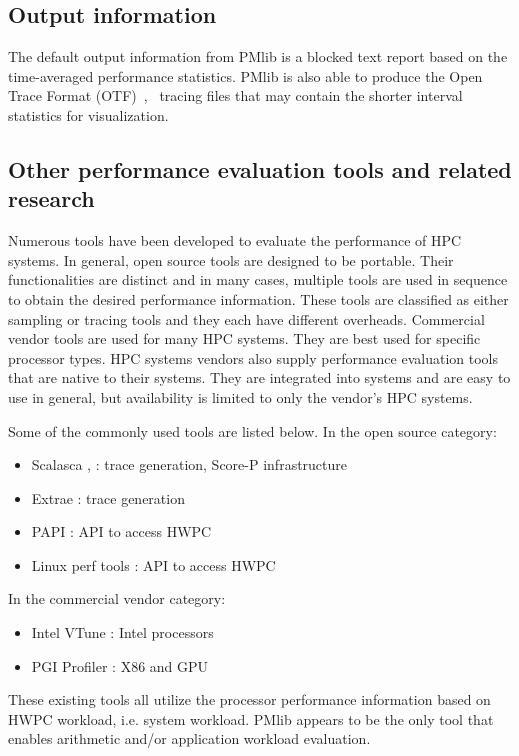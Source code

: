 \documentclass[conference]{IEEEtran}
\begin{document}
\subsection{Output information}
\label{subsection:PMlib-output-information}
The default output information from PMlib is a blocked text report based on
the time-averaged performance statistics.
PMlib is also able to produce the
Open Trace Format (OTF)~\cite{Knupfer:2006},~\cite{OTF:webpage-public}
tracing files that may contain the shorter interval statistics for visualization.
%
%


\subsection{Other performance evaluation tools and related research}
\label{subsection:related-research}
Numerous tools have been developed to evaluate the performance of HPC systems.
In general, open source tools are designed to be portable.
Their functionalities are distinct and in many cases, multiple tools
are used in sequence to obtain the desired performance information.
These tools are classified as either sampling or tracing tools and they each have different overheads.
Commercial vendor tools are used for many HPC systems.
They are best used for specific processor types.
HPC systems vendors also supply performance evaluation tools
that are native to their systems.
They are integrated into systems and are easy to use in general,
but availability is limited to only the vendor's HPC systems.

Some of the commonly used tools are listed below.
In the open source category:
\begin{itemize}
	\item Scalasca \cite{Scalasca:2017},\cite{Scalasca:2010}
			: trace generation, Score-P infrastructure
	\item Extrae \cite{Extrae:webpage} :  trace generation
	\item PAPI \cite{PAPI:5.6} : API to access HWPC
	\item Linux perf tools : API to access HWPC
\end{itemize}
In the commercial vendor category:
\begin{itemize}
		\item Intel VTune \cite{Intel:VTune} : Intel processors
		\item PGI Profiler \cite{PGI:Profiler} : X86 and GPU
\end{itemize}
These existing tools all utilize the processor performance information
based on HWPC workload, i.e. system workload.
PMlib appears to be the only tool that enables arithmetic and/or application
workload evaluation.
\end{document}
